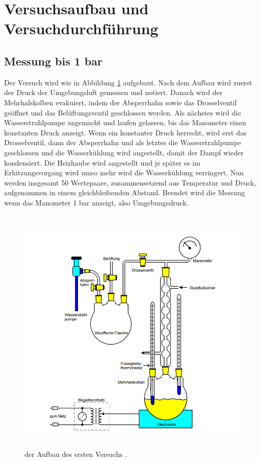 \section{Versuchsaufbau und Versuchdurchführung}

\subsection{Messung bis 1 bar }

\begin{flushleft}
    Der Versuch wird wie in Abbildung \ref{Abbildung3} aufgebaut.
    Nach dem Aufbau wird zuerst der Druck der Umgebungsluft gemessen und notiert.
    Danach wird der Mehrhalskolben evakuiert, indem der Absperrhahn sowie das Drosselventil geöffnet und das Belüftungsventil geschlossen werden.
    Als nächstes wird die Wasserstrahlpumpe angemacht und laufen gelassen, bis das Manometer einen konstanten Druck anzeigt.
    Wenn ein konstanter Druck herrscht, wird erst das Drosselventil, dann der Absperrhahn und als letztes die Wasserstrahlpumpe geschlossen und die Wasserkühlung wird angestellt, damit der Dampf wieder kondensiert.
    Die Heizhaube wird angestellt und je später es im Erhitzungsvorgang wird umso mehr wird die Wasserkühlung verringert.
    Nun werden insgesamt 50 Wertepaare, zusammensetzend aus Temperatur und Druck, aufgenommen in einem gleichbleibenden Abstand.
    Beendet wird die Messung wenn das Manometer 1 bar anzeigt, also Umgebungsdruck.
\end{flushleft}

\begin{figure}[H]       
    \centering
    \includegraphics[height=120mm]{bilder/A1.png}
    \caption{der Aufbau des ersten Versuchs \cite{a1}.\label{Abbildung3} }
\end{figure}

